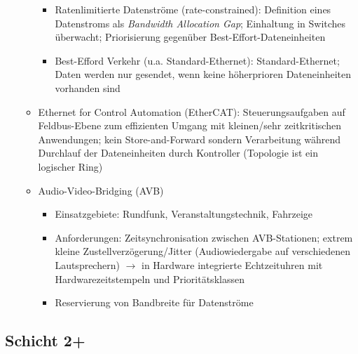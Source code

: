 \begin{itemize}
\begin{itemize}
\begin{itemize}
			\item Ratenlimitierte Datenströme (rate-constrained): Definition eines Datenstroms als \textit{Bandwidth Allocation Gap}; Einhaltung in Switches überwacht; Priorisierung gegenüber Best-Effort-Dateneinheiten
			\item Best-Efford Verkehr (u.a. Standard-Ethernet): Standard-Ethernet; Daten  werden nur gesendet, wenn keine höherprioren Dateneinheiten vorhanden sind
		\end{itemize}
		\item Ethernet for Control Automation (EtherCAT): Steuerungsaufgaben auf Feldbus-Ebene zum effizienten Umgang mit kleinen/sehr zeitkritischen Anwendungen; kein Store-and-Forward sondern Verarbeitung während Durchlauf der Dateneinheiten durch Kontroller (Topologie ist ein logischer Ring)
		\item Audio-Video-Bridging (AVB)
		\begin{itemize}
			\item Einsatzgebiete: Rundfunk, Veranstaltungstechnik, Fahrzeige
			\item Anforderungen: Zeitsynchronisation zwischen AVB-Stationen; extrem kleine Zustellverzögerung/Jitter (Audiowiedergabe auf verschiedenen Lautsprechern) \(\rightarrow\) in Hardware integrierte Echtzeituhren mit Hardwarezeitstempeln und Prioritätsklassen
			\item Reservierung von Bandbreite für Datenströme
		\end{itemize}
	\end{itemize}
\end{itemize}


\subsection{Schicht 2+}


